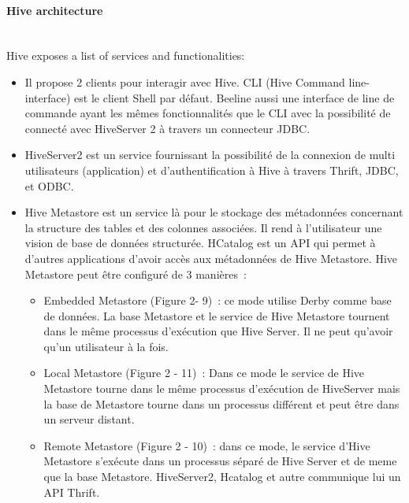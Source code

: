 \documentclass[12pt,english]{book}
\begin{document}

\paragraph{Hive architecture}\mbox{}\\

Hive exposes a list of services and functionalities:

\begin{itemize}
\item
Il propose 2 clients pour interagir avec Hive. 
CLI (Hive Command line-interface) est le client Shell par défaut. 
Beeline aussi une interface de line de commande ayant les mêmes fonctionnalités que le CLI avec la possibilité de connecté avec HiveServer 2 à travers un connecteur JDBC.
\item
HiveServer2 est un service fournissant la possibilité de la connexion de multi utilisateurs (application) et d’authentification à Hive à travers Thrift, JDBC, et ODBC. 
\item
Hive Metastore est un service là pour le stockage des métadonnées concernant la structure des tables et des colonnes associées.
Il rend à l’utilisateur une vision de base de données structurée.
HCatalog est un API qui permet à d’autres applications d’avoir accès aux métadonnées de Hive Metastore.
Hive Metastore peut être configuré de 3 manières : 
	\begin{itemize}
	\item
	Embedded Metastore (Figure 2- 9) : ce mode utilise Derby comme base de données. La base Metastore et le service de Hive Metastore tournent dans le même processus d’exécution que Hive Server. Il ne peut qu’avoir qu’un utilisateur à la fois.
	\item
	Local Metastore (Figure 2 - 11) : Dans ce mode le service de Hive Metastore tourne dans le même processus d’exécution de HiveServer mais la base de Metastore tourne dans un processus différent et peut être dans un serveur distant.
	\item
	Remote Metastore (Figure 2 - 10) : dans ce mode, le service d’Hive Metastore s’exécute dans un processus séparé de Hive Server et de meme que la base Metastore.
HiveServer2, Hcatalog et autre communique lui un API Thrift.
	\end{itemize}
\end{itemize}
\end{document}
